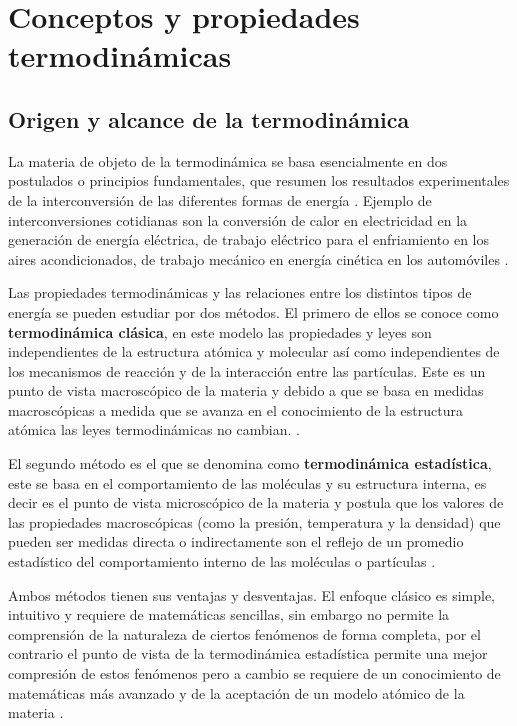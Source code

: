 \documentclass[master.tex]{subfiles}
\begin{document}
    \section{Conceptos y propiedades termodinámicas}

    \subsection{Origen y alcance de la termodinámica}

    La materia de objeto de la termodinámica se basa esencialmente en dos postulados o principios fundamentales, que resumen los resultados experimentales de la interconversión de las diferentes formas de energía \parencite{glasstone}. Ejemplo de interconversiones cotidianas son la conversión de calor en electricidad en la generación de energía eléctrica, de trabajo eléctrico para el enfriamiento en los aires acondicionados, de trabajo mecánico en energía cinética en los automóviles \parencite{faires}.

    Las propiedades termodinámicas y las relaciones entre los distintos tipos de energía se pueden estudiar por dos métodos. El primero de ellos se conoce como \textbf{termodinámica clásica}, en este modelo las propiedades y leyes son independientes de la estructura atómica y molecular así como independientes de los mecanismos de reacción y de la interacción entre las partículas. Este es un punto de vista macroscópico de la materia y debido a que se basa en medidas macroscópicas a medida que se avanza en el conocimiento de la estructura atómica las leyes termodinámicas no cambian. \parencites{faires}{glasstone}{wark}.

    El segundo método es el que se denomina como \textbf{termodinámica estadística}, este se basa en el comportamiento de las moléculas y su estructura interna, es decir es el punto de vista microscópico de la materia y postula que los valores de las propiedades macroscópicas (como la presión, temperatura y la densidad) que pueden ser medidas directa o indirectamente son el reflejo de un promedio estadístico del comportamiento interno de las moléculas o partículas \parencites{faires}{wark}.

    Ambos métodos tienen sus ventajas y desventajas. El enfoque clásico es simple, intuitivo y requiere de matemáticas sencillas, sin embargo no permite la comprensión de la naturaleza de ciertos fenómenos de forma completa, por el contrario el punto de vista de la termodinámica estadística permite una mejor compresión de estos fenómenos pero a cambio se requiere de un conocimiento de matemáticas más avanzado y de la aceptación de un modelo atómico de la materia \parencite{faires}. 

    
    
    \printbibliography[title=Bibliografía del capítulo]
    
\end{document}
